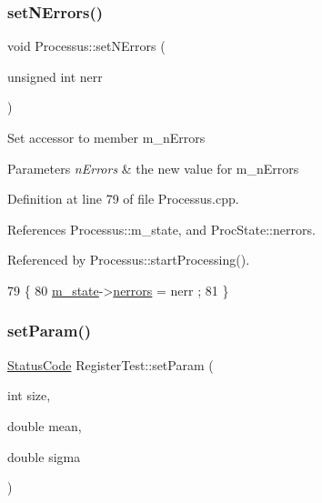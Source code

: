 \subsubsection{\texorpdfstring{set\+N\+Errors()}{setNErrors()}}
{\footnotesize\ttfamily void Processus\+::set\+N\+Errors (\begin{DoxyParamCaption}\item[{unsigned int}]{nerr }\end{DoxyParamCaption})\hspace{0.3cm}{\ttfamily [inherited]}}

Set accessor to member m\+\_\+n\+Errors 
\begin{DoxyParams}{Parameters}
{\em n\+Errors} & the new value for m\+\_\+n\+Errors \\
\hline
\end{DoxyParams}


Definition at line 79 of file Processus.\+cpp.



References Processus\+::m\+\_\+state, and Proc\+State\+::nerrors.



Referenced by Processus\+::start\+Processing().


\begin{DoxyCode}
79                                              \{
80   \hyperlink{classProcessus_ab3539eee42891ceae0baf4395ae7fb61}{m\_state}->\hyperlink{structProcState_a51a0f54ba62b07e07ac8518c5f32828d}{nerrors} = nerr ;
81 \}
\end{DoxyCode}
\mbox{\label{classRegisterTest_ac2c7c3721a238161d300bf1df5ffb1a5}} 
\subsubsection{\texorpdfstring{set\+Param()}{setParam()}}
{\footnotesize\ttfamily \hyperlink{classStatusCode}{Status\+Code} Register\+Test\+::set\+Param (\begin{DoxyParamCaption}\item[{int}]{size,  }\item[{double}]{mean,  }\item[{double}]{sigma }\end{DoxyParamCaption})\hspace{0.3cm}{\ttfamily [inline]}}



